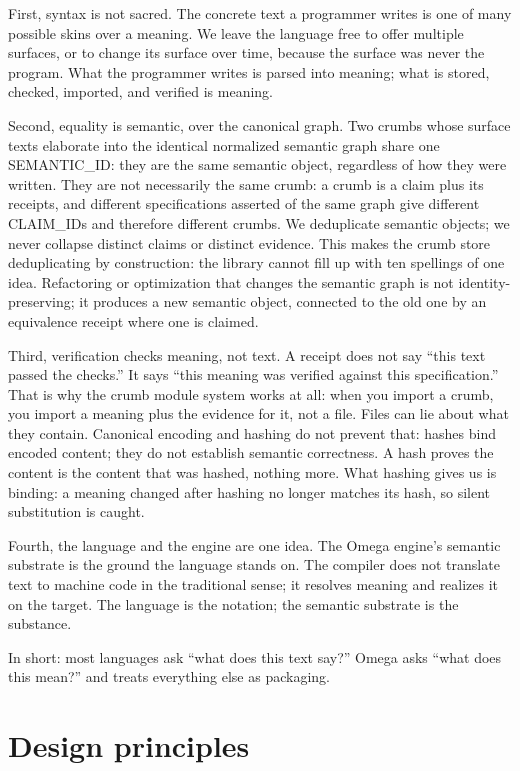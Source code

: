 \documentclass[11pt]{article}
\begin{document}
First, syntax is not sacred. The concrete text a programmer writes is one
of many possible skins over a meaning. We leave the language free to offer
multiple surfaces, or to change its surface over time, because the surface
was never the program. What the programmer writes is parsed into meaning;
what is stored, checked, imported, and verified is meaning.

Second, equality is semantic, over the canonical graph. Two crumbs whose
surface texts elaborate into the identical normalized semantic graph
share one SEMANTIC\_ID: they are the same semantic object, regardless
of how they were written. They are not necessarily the same crumb: a
crumb is a claim plus its receipts, and different specifications asserted
of the same graph give different CLAIM\_IDs and therefore different
crumbs. We deduplicate semantic objects; we never collapse distinct
claims or distinct evidence. This makes the crumb
store deduplicating by construction: the library cannot fill up with ten
spellings of one idea. Refactoring or optimization that changes the
semantic graph is not identity-preserving; it produces a new semantic
object, connected to the old one by an equivalence receipt where one is
claimed.

Third, verification checks meaning, not text. A receipt does not say ``this
text passed the checks.'' It says ``this meaning was verified against this
specification.'' That is why the crumb module system works at all: when you
import a crumb, you import a meaning plus the evidence for it, not a file.
Files can lie about what they contain. Canonical encoding and hashing do
not prevent that: hashes bind encoded content; they do not establish
semantic correctness. A hash proves the content is the content that was
hashed, nothing more. What hashing gives us is binding: a meaning changed
after hashing no longer matches its hash, so silent substitution is caught.

Fourth, the language and the engine are one idea. The Omega engine's
semantic substrate is the ground the language stands on. The compiler does
not translate text to machine code in the traditional sense; it resolves
meaning and realizes it on the target. The language is the notation; the
semantic substrate is the substance.

In short: most languages ask ``what does this text say?'' Omega asks
``what does this mean?'' and treats everything else as packaging.

\section{Design principles}
\end{document}
